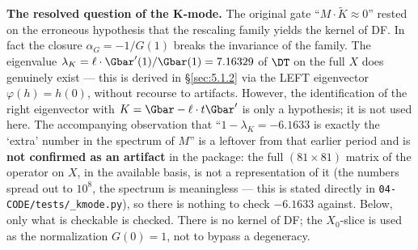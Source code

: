 \textbf{The resolved question of the K-mode.} The original gate
``$M\cdot \tilde K \approx 0$'' rested on the erroneous hypothesis that the rescaling
family yields the kernel of DF. In fact the closure
$\alpha_G = -1/G(1)$ breaks the invariance of the family. The eigenvalue
$\lambda_K = \ell\cdot \Gbar'(1)/\Gbar(1) = 7.16329$ of $\DT$ on the full $X$ does genuinely
exist --- this is derived in \S\ref{sec:5.1.2}{} via the LEFT eigenvector
$\varphi(h) = h(0)$, without recourse to artifacts. However, the
identification of the right eigenvector with $K = \Gbar - \ell\cdot t\Gbar'$ is only
a hypothesis; it is not used here. The accompanying observation that
``$1-\lambda_K = -6.1633$ is exactly the `extra' number in the spectrum of
$M$'' is a leftover from that earlier period and is \textbf{not confirmed as
an artifact} in the package: the full $(81\times 81)$ matrix of the operator
on $X$, in the available basis, is not a representation of it (the
numbers spread out to $10^{8}$, the spectrum is meaningless --- this is
stated directly in \texttt{04-\allowbreak CODE/\allowbreak tests/\allowbreak \_\allowbreak kmode.py}), so there is nothing to
check $-6.1633$ against. Below, only what is checkable is checked.
There is no kernel of DF; the $X_{0}$-slice is used as the normalization
$G(0)=1$, not to bypass a degeneracy.

